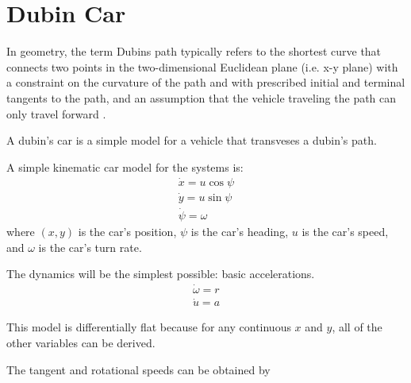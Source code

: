 \section{Dubin Car}
\label{sec:dubincarequations}

\par In geometry, the term Dubins path typically refers to the shortest curve that connects two points in the two-dimensional Euclidean plane (i.e. x-y plane) with a constraint on the curvature of the path and with prescribed initial and terminal tangents to the path, and an assumption that the vehicle traveling the path can only travel forward \cite{wiki:dubincar}. 
\par A dubin's car is a simple model for a vehicle that transveses a dubin's path.

\par A simple kinematic car model for the systems is: 
\begin{equation}
    \begin{gathered}
        \dot{x} = u \cos \psi \\
        \dot{y} = u \sin \psi \\
        \dot{\psi} = \omega
    \end{gathered}
\end{equation}
where $(x,y)$ is the car's position, $\psi$ is the car's heading, $u$ is the car's speed, and $\omega$ is the car's turn rate.

\par The dynamics will be the simplest possible: basic accelerations.
\begin{equation}
    \begin{gathered}
        \dot{\omega} = r \\
        \dot{u} = a
    \end{gathered}
\end{equation}

\par This model is differentially flat because for any continuous $x$ and $y$, all of the other variables can be derived.
\par The tangent and rotational speeds can be obtained by
    
